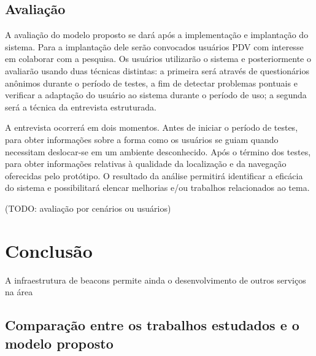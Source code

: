 \documentclass[english,brazilian]{UNISINOSmonografia}
\begin{document}
	\section{Avaliação}
A avaliação do modelo proposto se dará após a implementação e implantação do sistema. Para a implantação dele serão convocados usuários PDV com interesse em colaborar com a pesquisa. Os usuários utilizarão o sistema e posteriormente o avaliarão usando duas técnicas distintas: a primeira será através de questionários anônimos durante o período de testes, a fim de detectar problemas pontuais e verificar a adaptação do usuário ao sistema durante o período de uso; a segunda será a técnica da entrevista estruturada. 

A entrevista ocorrerá em dois momentos. Antes de iniciar o período de testes, para obter informações sobre a forma como os usuários se guiam quando necessitam deslocar-se em um ambiente desconhecido. Após o término dos testes, para obter informações relativas à qualidade da localização e da navegação oferecidas pelo protótipo. O resultado da análise permitirá identificar a eficácia do sistema e possibilitará elencar melhorias e/ou trabalhos relacionados ao tema.

(TODO: avaliação por cenários ou usuários)

\chapter{Conclusão}
A infraestrutura de beacons permite ainda o desenvolvimento de outros serviços na área

\section{Comparação entre os trabalhos estudados e o modelo proposto}
\end{document}
